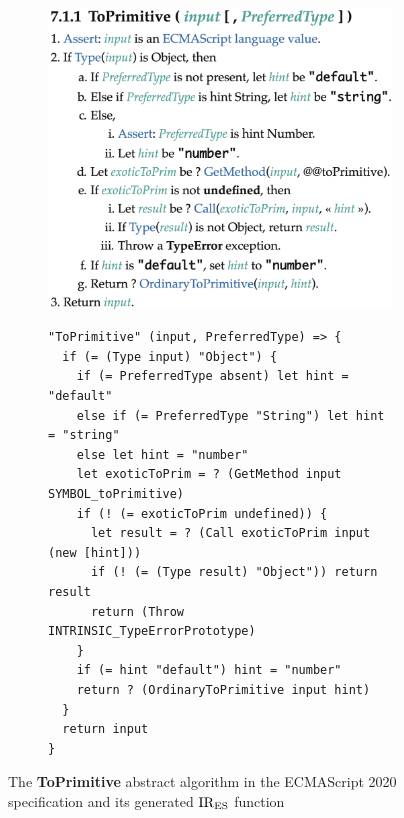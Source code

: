 \begin{figure}[t]
  \centering
  \begin{subfigure}{0.4\textwidth}
    \includegraphics[width=\textwidth]{img/to_primitive.png}
    \label{fig:to-primitive-es}
  \end{subfigure}
  \qquad
  \begin{subfigure}{0.48\textwidth}
    \begin{lstlisting}[style=ires]
"ToPrimitive" (input, PreferredType) => {
  if (= (Type input) "Object") {
    if (= PreferredType absent) let hint = "default"
    else if (= PreferredType "String") let hint = "string"
    else let hint = "number"
    let exoticToPrim = ? (GetMethod input SYMBOL_toPrimitive)
    if (! (= exoticToPrim undefined)) {
      let result = ? (Call exoticToPrim input (new [hint]))
      if (! (= (Type result) "Object")) return result
      return (Throw INTRINSIC_TypeErrorPrototype)
    }
    if (= hint "default") hint = "number"
    return ? (OrdinaryToPrimitive input hint)
  }
  return input
}
    \end{lstlisting}
    \label{fig:to-primitive-ires}
  \end{subfigure}
  \caption{The \textbf{ToPrimitive} abstract algorithm in the ECMAScript 2020 specification and its generated \( \text{IR}_\text{ES} \) function}
  \label{fig:to-primitive}
\end{figure}

